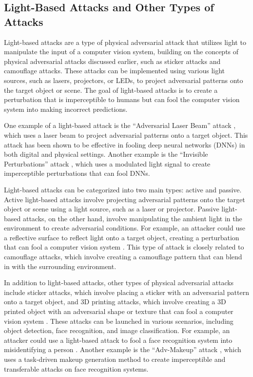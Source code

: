 \documentclass[11pt]{article}
\begin{document}
\subsection{Light-Based Attacks and Other Types of Attacks}

Light-based attacks are a type of physical adversarial attack that utilizes light to manipulate the input of a computer vision system, building on the concepts of physical adversarial attacks discussed earlier, such as sticker attacks and camouflage attacks. These attacks can be implemented using various light sources, such as lasers, projectors, or LEDs, to project adversarial patterns onto the target object or scene. The goal of light-based attacks is to create a perturbation that is imperceptible to humans but can fool the computer vision system into making incorrect predictions.

One example of a light-based attack is the ``Adversarial Laser Beam'' attack \cite{ref62}, which uses a laser beam to project adversarial patterns onto a target object. This attack has been shown to be effective in fooling deep neural networks (DNNs) in both digital and physical settings. Another example is the ``Invisible Perturbations'' attack \cite{ref24}, which uses a modulated light signal to create imperceptible perturbations that can fool DNNs.

Light-based attacks can be categorized into two main types: active and passive. Active light-based attacks involve projecting adversarial patterns onto the target object or scene using a light source, such as a laser or projector. Passive light-based attacks, on the other hand, involve manipulating the ambient light in the environment to create adversarial conditions. For example, an attacker could use a reflective surface to reflect light onto a target object, creating a perturbation that can fool a computer vision system \cite{ref57}. This type of attack is closely related to camouflage attacks, which involve creating a camouflage pattern that can blend in with the surrounding environment.

In addition to light-based attacks, other types of physical adversarial attacks include sticker attacks, which involve placing a sticker with an adversarial pattern onto a target object, and 3D printing attacks, which involve creating a 3D printed object with an adversarial shape or texture that can fool a computer vision system \cite{ref35}. These attacks can be launched in various scenarios, including object detection, face recognition, and image classification. For example, an attacker could use a light-based attack to fool a face recognition system into misidentifying a person \cite{ref63}. Another example is the ``Adv-Makeup'' attack \cite{ref64}, which uses a task-driven makeup generation method to create imperceptible and transferable attacks on face recognition systems.
\end{document}
